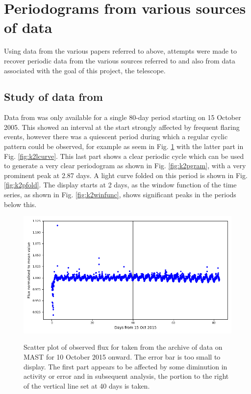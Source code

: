 \section{Periodograms from various sources of data}
\protect\label{section:variousrot}

Using data from the various papers referred to above, attempts were made to
recover periodic data from the various sources referred to and also from data
associated with the goal of this project, the {\rem} telescope.

\subsection{Study of data from \ktwo}
\protect\label{section:k2data}

Data from {\ktwo} was only available for a single 80-day period starting on 15
October 2005. This showed an interval at the start strongly affected by frequent
flaring events, however there was a quiescent period during which a regular
cyclic pattern could be observed, for example as seem in
Fig. \ref{fig:k2all} with the latter part in Fig. \ref{fig:k2lcurve}.
This last part shows a clear periodic cycle
which can be used to generate a very clear periodogram as shown in Fig.
\ref{fig:k2pgram}, with a very prominent peak at 2.87 days. A light curve folded
on this period is shown in Fig. \ref{fig:k2pfold}. The display starts at 2 days,
as the window function of the time series, as shown in Fig. \ref{fig:k2winfunc},
shows significant peaks in the periods below this.

\begin{figure}[!htbp]
\begin{center}
\includegraphics[scale=0.40]{k2/images/k2all.png} \\
\vspace{-.5cm}
\end{center}   
\caption{Scatter plot of observed flux for {\ross} taken from the archive of
{\ktwo} data on MAST for 10 October 2015 onward. The error bar is too small to
display. The first part appears to be affected by some diminution in activity or
error and in subsequent analysis, the portion to the right of the vertical line
set at 40 days is taken.}\protect\label{fig:k2all}
\end{figure}

